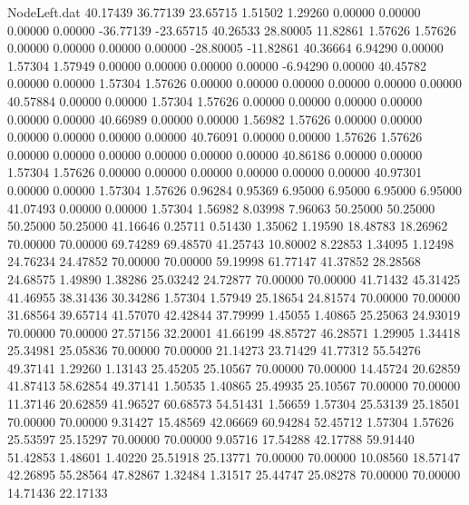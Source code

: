 \begin{filecontents}{NodeLeft.dat}
  40.17439   36.77139   23.65715     1.51502    1.29260    0.00000    0.00000    0.00000    0.00000  -36.77139  -23.65715
  40.26533   28.80005   11.82861     1.57626    1.57626    0.00000    0.00000    0.00000    0.00000  -28.80005  -11.82861
  40.36664    6.94290    0.00000     1.57304    1.57949    0.00000    0.00000    0.00000    0.00000   -6.94290    0.00000
  40.45782    0.00000    0.00000     1.57304    1.57626    0.00000    0.00000    0.00000    0.00000    0.00000    0.00000
  40.57884    0.00000    0.00000     1.57304    1.57626    0.00000    0.00000    0.00000    0.00000    0.00000    0.00000
  40.66989    0.00000    0.00000     1.56982    1.57626    0.00000    0.00000    0.00000    0.00000    0.00000    0.00000
  40.76091    0.00000    0.00000     1.57626    1.57626    0.00000    0.00000    0.00000    0.00000    0.00000    0.00000
  40.86186    0.00000    0.00000     1.57304    1.57626    0.00000    0.00000    0.00000    0.00000    0.00000    0.00000
  40.97301    0.00000    0.00000     1.57304    1.57626    0.96284    0.95369    6.95000    6.95000    6.95000    6.95000
  41.07493    0.00000    0.00000     1.57304    1.56982    8.03998    7.96063   50.25000   50.25000   50.25000   50.25000
  41.16646    0.25711    0.51430     1.35062    1.19590   18.48783   18.26962   70.00000   70.00000   69.74289   69.48570
  41.25743   10.80002    8.22853     1.34095    1.12498   24.76234   24.47852   70.00000   70.00000   59.19998   61.77147
  41.37852   28.28568   24.68575     1.49890    1.38286   25.03242   24.72877   70.00000   70.00000   41.71432   45.31425
  41.46955   38.31436   30.34286     1.57304    1.57949   25.18654   24.81574   70.00000   70.00000   31.68564   39.65714
  41.57070   42.42844   37.79999     1.45055    1.40865   25.25063   24.93019   70.00000   70.00000   27.57156   32.20001
  41.66199   48.85727   46.28571     1.29905    1.34418   25.34981   25.05836   70.00000   70.00000   21.14273   23.71429
  41.77312   55.54276   49.37141     1.29260    1.13143   25.45205   25.10567   70.00000   70.00000   14.45724   20.62859
  41.87413   58.62854   49.37141     1.50535    1.40865   25.49935   25.10567   70.00000   70.00000   11.37146   20.62859
  41.96527   60.68573   54.51431     1.56659    1.57304   25.53139   25.18501   70.00000   70.00000    9.31427   15.48569
  42.06669   60.94284   52.45712     1.57304    1.57626   25.53597   25.15297   70.00000   70.00000    9.05716   17.54288
  42.17788   59.91440   51.42853     1.48601    1.40220   25.51918   25.13771   70.00000   70.00000   10.08560   18.57147
  42.26895   55.28564   47.82867     1.32484    1.31517   25.44747   25.08278   70.00000   70.00000   14.71436   22.17133

\end{filecontents}
